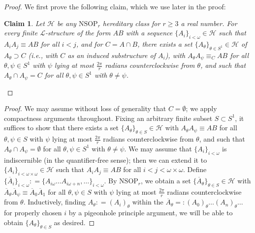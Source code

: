 \documentclass{amsart}
\newtheorem{claim}[theorem]{Claim}
\theoremstyle{definition}
\theoremstyle{remark}
\numberwithin{equation}{section}
\begin{document}
\begin{proof}
   We first prove the following claim, which we use later in the proof:

  

   \begin{claim}\label{circle with disjoint terms}
        Let $\mathcal{H}$ be any $\mathrm{NSOP}_{r}$ hereditary class for $r \geq 3$ a real number. For every finite $\mathcal{L}$-structure of the form $AB$ with a sequence $\{A_{i}\}_{i < \omega} \in \mathcal{H}$ such that $A_{i}A_{j} \equiv AB$ for all $i < j$, and for $C = A \cap B$, there exists a set $\{ A_{\theta}\}_{\theta \in S^{1}} \in \mathcal{H}$ of $A_{\theta} \supset C$ (i.e., with $C$ as an induced substructure of $A_{i}$), with $A_{\theta}A_{\psi} \equiv_{C} AB$ for all $\theta, \psi \in S^{1}$ with $\psi$ lying at most $\frac{2\pi}{r}$ radians counterclockwise from $\theta$, and such that $A_{\theta} \cap A_{\psi} = C$ for all $\theta, \psi \in S^{1}$ with $\theta \neq \psi$.
   \end{claim}
\end{proof}

\begin{proof}
    We may assume without loss of generality that $C = \emptyset$; we apply compactness arguments throughout. Fixing an arbitrary finite subset $S \subset S^{1}$, it suffices to show that there exists a set $\{ A_{\theta}\}_{\theta \in S} \in \mathcal{H}$ with $A_{\theta}A_{\psi} \equiv AB$ for all $\theta, \psi \in S$ with $\psi$ lying at most $\frac{2\pi}{r}$ radians counterclockwise from $\theta$, and such that $A_{\theta} \cap A_{\psi} = \emptyset$ for all $\theta, \psi \in S^{1}$ with $\theta \neq \psi$. We may assume that $\{A_{i}\}_{i < \omega}$ is indiscernible (in the quantifier-free sense); then we can extend it to $\{A_{i}\}_{i < \omega \times \omega} \in \mathcal{H}$ such that $A_{i}A_{j} \equiv AB$ for all $i < j < \omega \times \omega$. Define $\{\overline{A}_{i}\}_{i < \omega} : = \{A_{i \omega} \ldots A_{i\omega + n}, \ldots\}_{i < \omega}$. By $\mathrm{NSOP}_{r}$, we obtain a set $\{ \overline{A}_{\theta}\}_{\theta \in S} \in \mathcal{H}$ with $\overline{A}_{\theta}\overline{A}_{\psi} \equiv \overline{A}_{0} \overline{A}_{1}$ for all $\theta, \psi \in S$ with $\psi$ lying at most $\frac{2\pi}{r}$ radians counterclockwise from $\theta$. Inductively, finding $A_{\theta} : = (A_{i})_{\theta}$ within the $\overline{A}_{\theta} =: (A_{0})_{\theta} \ldots (A_{n})_{\theta} \ldots $ for properly chosen $i$ by a pigeonhole principle argument, we will be able to obtain $\{ A_{\theta}\}_{\theta \in S}$ as desired.
\end{proof}
\end{document}
